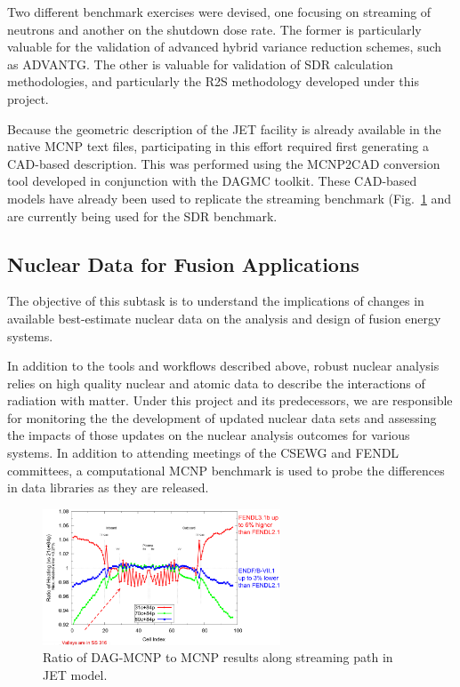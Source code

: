 Two different benchmark exercises were devised, one focusing on streaming of
neutrons and another on the shutdown dose rate.  The former is particularly
valuable for the validation of advanced hybrid variance reduction schemes,
such as ADVANTG.  The other is valuable for validation of \gls{SDR}
calculation methodologies, and particularly the \gls{R2S} methodology
developed under this project.

Because the geometric description of the JET facility is already available in
the native MCNP text files, participating in this effort required first
generating a \gls{CAD}-based description.  This was performed using the
MCNP2CAD conversion tool developed in conjunction with the \gls{DAGMC}
toolkit.  These \gls{CAD}-based models have already been used to replicate the
streaming benchmark (Fig.\ \ref{fig:jet-streaming-benchmark} and are currently
being used for the \gls{SDR} benchmark.

\subsection{Nuclear Data for Fusion Applications}

The objective of this subtask is to understand the implications of changes in
available best-estimate nuclear data on the analysis and design of fusion
energy systems.

In addition to the tools and workflows described above, robust nuclear
analysis relies on high quality nuclear and atomic data to describe the
interactions of radiation with matter.  Under this project and its
predecessors, we are responsible for monitoring the the development of updated
nuclear data sets and assessing the impacts of those updates on the nuclear
analysis outcomes for various systems.  In addition to attending meetings of
the \gls{CSEWG} and \gls{FENDL} committees, a computational MCNP benchmark is
used to probe the differences in data libraries as they are released.

\begin{figure}
\centering
\includegraphics[width=0.63\textwidth]{imgs/fendl3.png}
\caption{\label{fig:jet-streaming-benchmark}Ratio of DAG-MCNP to MCNP results
  along streaming path in JET model.}
\end{figure}

